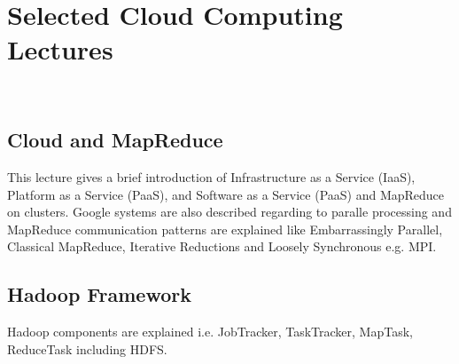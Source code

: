 \chapter{Selected Cloud Computing Lectures}
\label{sec:icloud-selected-lectures}

\FILENAME\

\begin{comment}
  \section{Selected Cloud Computing Lectures after Review}

  The following video lectures and slides are selectively collected to use in
  the current class E516/616 if we found the materials are still valid to teach
  and meaningful although recording was made a few years ago. This might be
  true if general concepts and theories have not changed over time. Some
  modification or re-recording will occur if necessary.

\end{comment}

\section{Cloud and MapReduce}

This lecture gives a brief introduction of Infrastructure as a Service (IaaS),
Platform as a Service (PaaS), and Software as a Service (PaaS) and MapReduce on
clusters. Google systems are also described regarding to paralle processing and
MapReduce communication patterns are explained like Embarrassingly Parallel,
Classical MapReduce, Iterative Reductions and Loosely Synchronous e.g. MPI.


\section{Hadoop Framework}

Hadoop components are explained i.e. JobTracker, TaskTracker, MapTask,
ReduceTask including HDFS.


